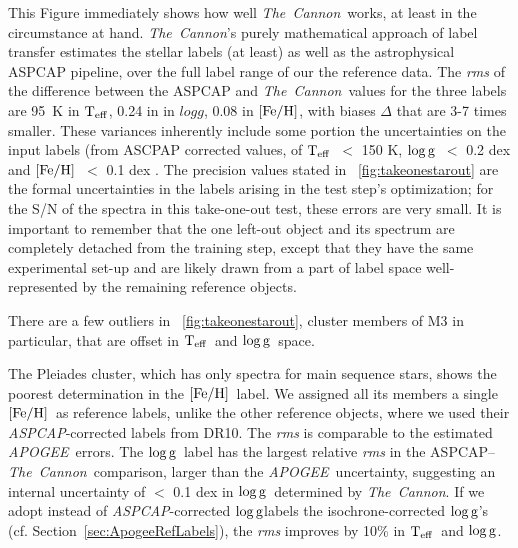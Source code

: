 \documentclass[12pt, preprint]{aastex}
\newcommand{\sectionname}{Section}
\newcommand{\teff}{\mbox{$\rm T_{eff}$}}
\newcommand{\feh}{\mbox{$\rm [Fe/H]$}}
\newcommand{\logg}{\mbox{$\rm \log g$}}
\newcommand{\tc}{\textsl{The~Cannon}}
\newcommand{\apogee}{\textsl{APOGEE}}
\newcommand{\aspcap}{\textsl{ASPCAP}}
\begin{document}
This Figure immediately shows how well \tc\ works, at least in the circumstance at hand.
\tc 's purely mathematical approach of label transfer estimates the stellar labels (at least) as well as the astrophysical ASPCAP pipeline,
over the full label range of our the reference data. The \textit{rms} of the difference between the ASPCAP and \tc\ values for the three labels are
95~K in $\teff$, 0.24 in in $logg$, 0.08 in $\feh$, with biases $\Delta$ that are 3-7 times smaller.  
These variances inherently include some portion the uncertainties on the input labels (from ASCPAP corrected values, 
of \teff\ $<$ 150 K, \logg\ $<$ 0.2 dex and \feh\ $<$ 0.1 dex \citep{Meszaros2013}.
The precision values stated in \figurename~\ref{fig:takeonestarout} are the formal uncertainties in the labels arising 
in the test step's optimization; for the S/N of the spectra in this take-one-out test, these errors are very small.
It is important to remember that the one left-out object and its spectrum are completely detached from the training step, 
except that they have the same experimental set-up and are likely drawn from a part of label space well-represented by the remaining reference objects.

There are a few outliers in \figurename~\ref{fig:takeonestarout}, cluster members of M3 in particular, that are offset in \teff\ and \logg\ space. 

The Pleiades cluster, which has only spectra for main sequence stars, shows the poorest determination in the \feh\ label. We assigned all its members a single \feh ~as reference labels, unlike the other reference objects, where we used their \aspcap -corrected labels from DR10.
The \textit{rms} is comparable to the estimated \apogee\ errors. The \logg\ label has the largest relative \textit{rms} in the ASPCAP--\tc\ comparison, larger than the \apogee\ uncertainty, suggesting an internal uncertainty of $<$ 0.1 dex in \logg\ determined by \tc.
If we adopt instead of \aspcap -corrected \logg labels the isochrone-corrected \logg 's (cf. \sectionname~\ref{sec:ApogeeRefLabels}), the \textit{rms} improves by 10\% in \teff\ and \logg .


\end{document}
